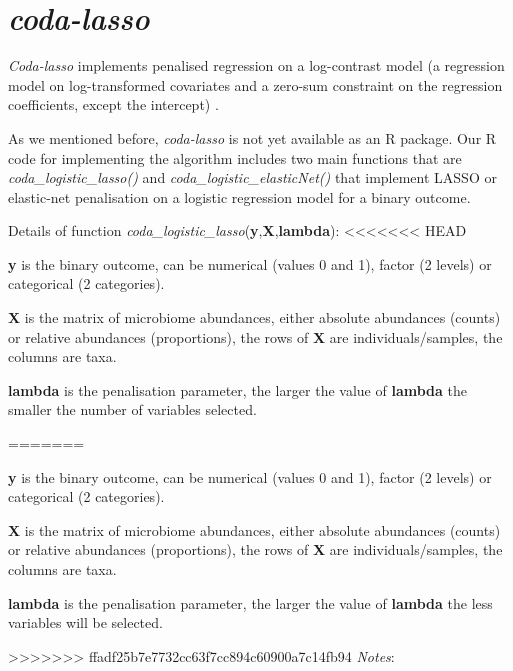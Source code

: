 \documentclass[openany]{book}
\begin{document}
\chapter{\texorpdfstring{\emph{coda-lasso}}{coda-lasso}}\label{coda}

\emph{Coda-lasso} implements penalised regression on a log-contrast
model (a regression model on log-transformed covariates and a zero-sum
constraint on the regression coefficients, except the intercept)
\citep{lu2019generalized, lin2014variable}.

As we mentioned before, \emph{coda-lasso} is not yet available as an R
package. Our R code for implementing the algorithm includes two main
functions that are \emph{coda\_logistic\_lasso()} and
\emph{coda\_logistic\_elasticNet()} that implement LASSO or elastic-net
penalisation on a logistic regression model for a binary outcome.

Details of function
\emph{coda\_logistic\_lasso}(\textbf{y},\textbf{X},\textbf{lambda}):
<<<<<<< HEAD

\textbf{y} is the binary outcome, can be numerical (values 0 and 1),
factor (2 levels) or categorical (2 categories).

\textbf{X} is the matrix of microbiome abundances, either absolute
abundances (counts) or relative abundances (proportions), the rows of
\textbf{X} are individuals/samples, the columns are taxa.

\textbf{lambda} is the penalisation parameter, the larger the value of
\textbf{lambda} the smaller the number of variables selected.

=======

\textbf{y} is the binary outcome, can be numerical (values 0 and 1),
factor (2 levels) or categorical (2 categories).

\textbf{X} is the matrix of microbiome abundances, either absolute
abundances (counts) or relative abundances (proportions), the rows of
\textbf{X} are individuals/samples, the columns are taxa.

\textbf{lambda} is the penalisation parameter, the larger the value of
\textbf{lambda} the less variables will be selected.

>>>>>>> ffadf25b7e7732cc63f7cc894c60900a7c14fb94
\emph{Notes}:
\end{document}

